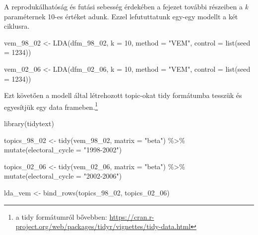 \documentclass[
]{book}
\newenvironment{Shaded}{\begin{snugshade}}{\end{snugshade}}
\newcommand{\AttributeTok}[1]{\textcolor[rgb]{0.77,0.63,0.00}{#1}}
\newcommand{\DecValTok}[1]{\textcolor[rgb]{0.00,0.00,0.81}{#1}}
\newcommand{\FunctionTok}[1]{\textcolor[rgb]{0.00,0.00,0.00}{#1}}
\newcommand{\NormalTok}[1]{#1}
\newcommand{\OtherTok}[1]{\textcolor[rgb]{0.56,0.35,0.01}{#1}}
\newcommand{\SpecialCharTok}[1]{\textcolor[rgb]{0.00,0.00,0.00}{#1}}
\newcommand{\StringTok}[1]{\textcolor[rgb]{0.31,0.60,0.02}{#1}}
\begin{document}
A reprodukálhatóság és futási sebesség érdekében a fejezet további
részeiben a \emph{k} paraméternek 10-es értéket adunk. Ezzel
lefututtatunk egy-egy modellt a két ciklusra.

\begin{Shaded}
\begin{Highlighting}[]
\NormalTok{vem\_98\_02 }\OtherTok{\textless{}{-}} \FunctionTok{LDA}\NormalTok{(dfm\_98\_02, }\AttributeTok{k =} \DecValTok{10}\NormalTok{, }\AttributeTok{method =} \StringTok{"VEM"}\NormalTok{, }\AttributeTok{control =} \FunctionTok{list}\NormalTok{(}\AttributeTok{seed =} \DecValTok{1234}\NormalTok{))}

\NormalTok{vem\_02\_06 }\OtherTok{\textless{}{-}} \FunctionTok{LDA}\NormalTok{(dfm\_02\_06, }\AttributeTok{k =} \DecValTok{10}\NormalTok{, }\AttributeTok{method =} \StringTok{"VEM"}\NormalTok{, }\AttributeTok{control =} \FunctionTok{list}\NormalTok{(}\AttributeTok{seed =} \DecValTok{1234}\NormalTok{))}
\end{Highlighting}
\end{Shaded}

Ezt követően a modell által létrehozott topic-okat tidy formátumba
tesszük és egyesítjük egy data frameben.\footnote{a tidy formátumról
  bővebben:
  \url{https://cran.r-project.org/web/packages/tidyr/vignettes/tidy-data.html}}

\begin{Shaded}
\begin{Highlighting}[]
\FunctionTok{library}\NormalTok{(tidytext)}
\end{Highlighting}
\end{Shaded}

\begin{Shaded}
\begin{Highlighting}[]
\NormalTok{topics\_98\_02 }\OtherTok{\textless{}{-}} \FunctionTok{tidy}\NormalTok{(vem\_98\_02, }\AttributeTok{matrix =} \StringTok{"beta"}\NormalTok{) }\SpecialCharTok{\%\textgreater{}\%}
  \FunctionTok{mutate}\NormalTok{(}\AttributeTok{electoral\_cycle =} \StringTok{"1998{-}2002"}\NormalTok{)}

\NormalTok{topics\_02\_06 }\OtherTok{\textless{}{-}} \FunctionTok{tidy}\NormalTok{(vem\_02\_06, }\AttributeTok{matrix =} \StringTok{"beta"}\NormalTok{) }\SpecialCharTok{\%\textgreater{}\%}
  \FunctionTok{mutate}\NormalTok{(}\AttributeTok{electoral\_cycle =} \StringTok{"2002{-}2006"}\NormalTok{)}

\NormalTok{lda\_vem }\OtherTok{\textless{}{-}} \FunctionTok{bind\_rows}\NormalTok{(topics\_98\_02, topics\_02\_06)}
\end{Highlighting}
\end{Shaded}
\end{document}
